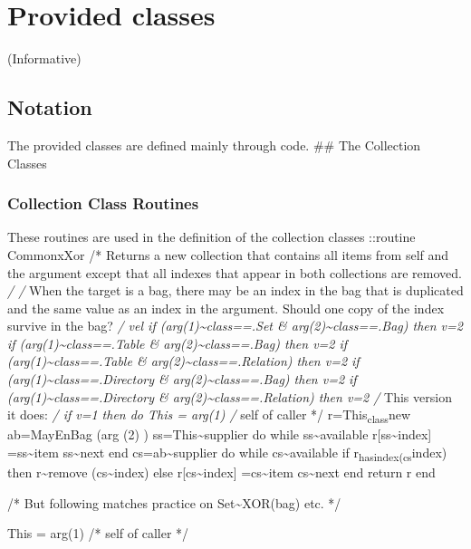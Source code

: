 \chapter{Provided classes}\label{provided-classes}

(Informative)

\section{Notation}\label{notation}

The provided classes are defined mainly through code. \#\# The
Collection Classes

\subsection{Collection Class Routines}\label{collection-class-routines}

These routines are used in the definition of the collection classes
::routine CommonxXor /* Returns a new collection that contains all items
from self and the argument except that all indexes that appear in both
collections are removed. \emph{/ /} When the target is a bag, there may
be an index in the bag that is duplicated and the same value as an index
in the argument. Should one copy of the index survive in the bag?
\emph{/ vel if (arg(1)\textasciitilde class==.Set \&
arg(2)\textasciitilde class==.Bag) then v=2 if
(arg(1)\textasciitilde class==.Table \&
arg(2)\textasciitilde class==.Bag) then v=2 if
(arg(1)\textasciitilde class==.Table \&
arg(2)\textasciitilde class==.Relation) then v=2 if
(arg(1)\textasciitilde class==.Directory \&
arg(2)\textasciitilde class==.Bag) then v=2 if
(arg(1)\textasciitilde class==.Directory \&
arg(2)\textasciitilde class==.Relation) then v=2 /} This version it
does: \emph{/ if v=1 then do This = arg(1) /} self of caller */
r=This\textsubscript{class}new ab=MayEnBag (arg (2) )
ss=This\textasciitilde supplier do while ss\textasciitilde available
r{[}ss\textasciitilde index{]} =ss\textasciitilde item
ss\textasciitilde next end cs=ab\textasciitilde supplier do while
cs\textasciitilde available if r\textsubscript{hasindex(cs}index) then
r\textasciitilde remove (cs\textasciitilde index) else
r{[}cs\textasciitilde index{]} =cs\textasciitilde item
cs\textasciitilde next end return r end

/* But following matches practice on Set\textasciitilde XOR(bag) etc. */

This = arg(1) /* self of caller */

